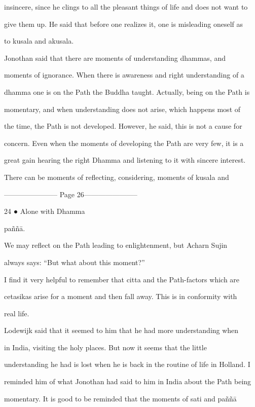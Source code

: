 insincere, since he clings to all the pleasant things of life and does not want to  

give them up. He said that before one realizes it, one is misleading oneself as  

to kusala and akusala. 

   Jonothan   said   that   there   are   moments   of   understanding   dhammas,   and  

moments of ignorance. When there is awareness and right understanding of a  

dhamma one is on the Path the Buddha taught. Actually, being on the Path is  

momentary,  and when understanding does not  arise, which happens most of  

the time, the Path is not developed. However, he said, this is not a cause for  

concern. Even when the moments of developing the Path are very few, it is a  

great gain hearing the right Dhamma and listening to it with sincere interest.  

There   can   be   moments   of   reflecting,   considering,   moments   of  kusala   and  


----------------------- Page 26-----------------------

24 ● Alone with Dhamma 



paññā. 

   We  may  reflect  on  the  Path  leading  to  enlightenment,  but  Acharn   Sujin  

always says: “But what about this moment?” 

   I find it very helpful to remember that citta and the Path-factors which are  

cetasikas  arise  for  a  moment  and  then  fall  away. This  is  in  conformity with  

real life. 

   Lodewijk said that it seemed to him that he had more understanding when  

in   India,   visiting   the   holy   places.   But   now   it   seems   that   the   little  

understanding he had is lost when he is back in the routine of life in Holland. I  

reminded him of what Jonothan had said to him in India about the Path being  

momentary.  It  is  good  to be  reminded  that  the  moments  of  sati  and  paññā  

